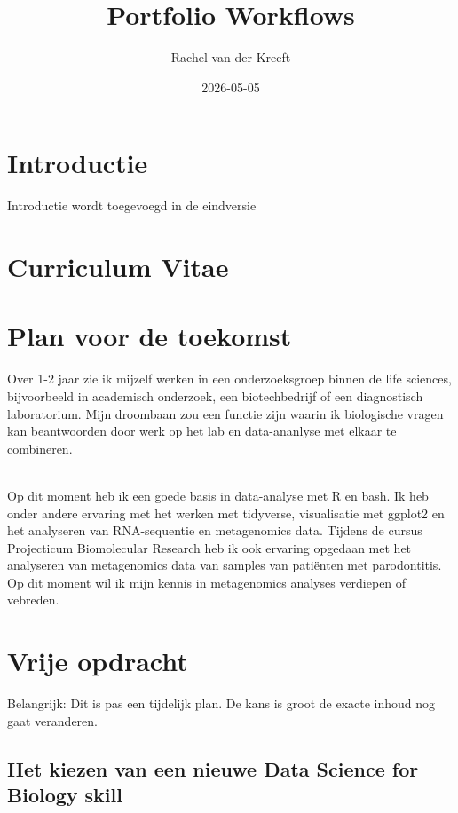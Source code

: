 \documentclass[
]{book}
\title{Portfolio Workflows}
\author{Rachel van der Kreeft}
\date{2026-05-05}
\begin{document}
\maketitle

{
\setcounter{tocdepth}{1}
\tableofcontents
}
\chapter{Introductie}\label{introductie}

Introductie wordt toegevoegd in de eindversie

\chapter{Curriculum Vitae}\label{curriculum-vitae}

\chapter{Plan voor de toekomst}\label{plan-voor-de-toekomst}

Over 1-2 jaar zie ik mijzelf werken in een onderzoeksgroep binnen de life sciences, bijvoorbeeld in academisch onderzoek, een biotechbedrijf of een diagnostisch laboratorium. Mijn droombaan zou een functie zijn waarin ik biologische vragen kan beantwoorden door werk op het lab en data-ananlyse met elkaar te combineren.\\
\strut \\
Op dit moment heb ik een goede basis in data-analyse met R en bash. Ik heb onder andere ervaring met het werken met tidyverse, visualisatie met ggplot2 en het analyseren van RNA-sequentie en metagenomics data. Tijdens de cursus Projecticum Biomolecular Research heb ik ook ervaring opgedaan met het analyseren van metagenomics data van samples van patiënten met parodontitis. Op dit moment wil ik mijn kennis in metagenomics analyses verdiepen of vebreden.

\chapter{Vrije opdracht}\label{vrije-opdracht}

\hfill\break
\hfill\break
Belangrijk: Dit is pas een tijdelijk plan. De kans is groot de exacte inhoud nog gaat veranderen.\\

\section{Het kiezen van een nieuwe Data Science for Biology skill}\label{het-kiezen-van-een-nieuwe-data-science-for-biology-skill}
\end{document}

